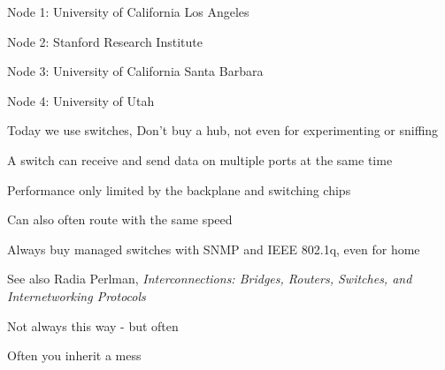 \documentclass[Screen16to9,17pt]{foils}
\begin{document}
\begin{list2}
\item Node 1: University of California Los Angeles
\item Node 2: Stanford Research Institute
\item Node 3: University of California Santa Barbara
\item Node 4: University of Utah
\end{list2}





\begin{list1}
\item Today we use switches, Don't buy a hub, not even for experimenting or sniffing
\item A switch can receive and send data on multiple ports at the same time
\item Performance only limited by the backplane and switching chips
\item Can also often route with the same speed
\item Always buy managed switches with SNMP and IEEE 802.1q, even for home
\end{list1}




See also Radia Perlman, \emph{Interconnections: Bridges, Routers, Switches, and Internetworking Protocols}



\centerline{Not always this way - but often }



\centerline{Often you inherit a mess}





\end{document}
